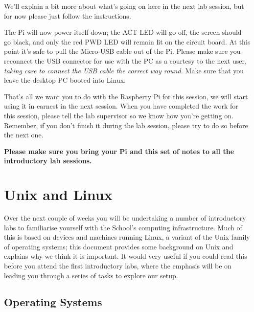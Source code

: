 \noindent We'll explain a bit more about what's going on here in the next lab session, but for now please just follow the instructions.


The  Pi will now power itself down; the ACT LED will go off, the screen should go black, and only the red PWD LED will remain lit on the circuit board. At this point it's safe to pull the Micro-USB cable out of the Pi. Please make sure you reconnect the USB connector for use with the PC  as a courtesy to the next user, \emph{taking care to connect the USB cable the correct way round. } Make sure that you leave the desktop PC booted into Linux.

That's all we want you to do with the Raspberry Pi for this session, we will start using it in earnest in the next session.  When you have completed the work for this session, please tell the lab supervisor so we know how you're getting on. Remember, if you don't finish it during the lab session, please try to do so before the next one.

\textbf{Please make sure you bring your Pi and this set of notes to all the introductory lab sessions.}

\cleardoublepage

\section{Unix and Linux}
\label{sec:unix-linux}


Over the next couple of weeks you will be undertaking a number of
introductory labs to familiarise yourself with the School's computing
infrastructure. Much of this is based on devices and machines running Linux, a
variant of the Unix family of operating systems; this document
provides some background on Unix and explains why we think it is
important. It would very useful if you could read this before you
attend the first introductory labs, where the emphasis will be on
leading you through a series of tasks to explore our setup.

\subsection{Operating Systems}

